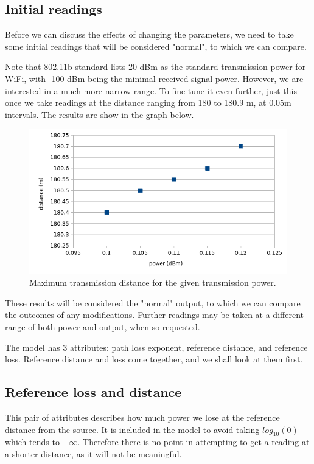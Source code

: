 \documentclass[11pt,journal]{article}
\begin{document}
	\subsection{Initial readings}
	Before we can discuss the effects of changing the parameters, we need to take some initial readings that will be considered "normal", to which we can compare.
	
	Note that 802.11b standard lists 20 dBm as the standard transmission power for WiFi, with -100 dBm being the minimal received signal power. However, we are interested in a much more narrow range. To fine-tune it even further, just this once we take readings at the distance ranging from 180 to 180.9 m, at 0.05m intervals. The results are show in the graph below.
		\begin{figure}[h]
		\centering
		\includegraphics[scale=0.6]{graph_initial.png}
		\caption{Maximum transmission distance for the given transmission power.}
	\end{figure}
	
	These results will be considered the "normal" output, to which we can compare the outcomes of any modifications. Further readings may be taken at a different range of both power and output, when so requested.
	
	The model has 3 attributes: path loss exponent, reference distance, and reference loss. Reference distance and loss come together, and we shall look at them first. 
	
	\subsection{Reference loss and distance}
	This pair of attributes describes how much power we lose at the reference distance from the source. It is included in the model to avoid taking $log_{10}(0)$ which tends to $-\infty$. Therefore there is no point in attempting to get a reading at a shorter distance, as it will not be meaningful. 
	
\end{document}
